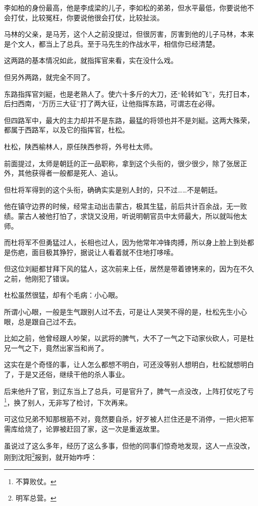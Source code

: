\begin{multicols}{\theparacolNo}
		李如柏的身份最高，他是李成梁的儿子，李如松的弟弟，但水平最低，你要说他不会打仗，比较冤枉，你要说他很会打仗，比较扯淡。

		马林的父亲，是马芳，这个人之前没提过，但很厉害，厉害到他的儿子马林，本来是个文人，都当上了总兵。至于马先生的作战水平，相信你已经清楚。

		这两路的基本情况如此，就指挥官来看，实在没什么戏。

		但另外两路，就完全不同了。

		东路指挥官刘綎，也是老熟人了。使六十多斤的大刀，还“轮转如飞”，先打日本，后扫西南，“万历三大征”打了两大征，让他指挥东路，可谓志在必得。

		但四路军中，最大的主力却并不是东路，最猛的将领也并不是刘綎。这两大殊荣，都属于西路军，以及它的指挥官，杜松。

		杜松，陕西榆林人，原任陕西参将，外号杜太师。

		前面提过，太师是朝廷的正一品职称，拿到这个头衔的，很少很少，除了张居正外，其他获得者一般都是死人、追认。

		但杜将军得到的这个头衔，确确实实是别人封的，只不过……不是朝廷。

		他在镇守边界的时候，经常主动出击蒙古，极其生猛，前后共计百余战，无一败绩。蒙古人被他打怕了，求饶又没用，听说明朝官员中太师最大，所以就叫他太师。

		而杜将军不但勇猛过人，长相也过人，因为他常年冲锋肉搏，所以身上脸上到处都是伤疤，面目极其狰狞，据说让人看着就不住地打哆嗦。

		但这位刘綎都甘拜下风的猛人，这次前来上任，居然是带着镣铐来的，因为在不久之前，他刚犯了错误。

		杜松虽然很猛，却有个毛病：小心眼。

		所谓小心眼，一般是生气跟别人过不去，可是让人哭笑不得的是，杜松先生小心眼，总是跟自己过不去。

		比如之前，他曾经跟人吵架，以武将的脾气，大不了一气之下动家伙砍人，可是杜兄一气之下，竟然出家当和尚了。

		这实在是个奇怪的事，让人怎么都想不明白，可还没等别人想明白，杜松就想明白了，于是又还俗，继续干他的杀人事业。

		后来他升了官，到辽东当上了总兵，可是官升了，脾气一点没改，上阵打仗吃了亏\footnote{不算败仗。}，换了别人，无非写了检讨，下次再来。

		可这位兄弟不知那根筋不对，竟然要自杀，好歹被人拦住还是不消停，一把火把军需库给烧了，论罪被赶回了家，这一次是重返故里。

		虽说过了这么多年，经历了这么多事，但他的同事们惊奇地发现，这人一点没改，刚到沈阳\footnote{明军总营。}报到，就开始咋呼：


\end{multicols}
